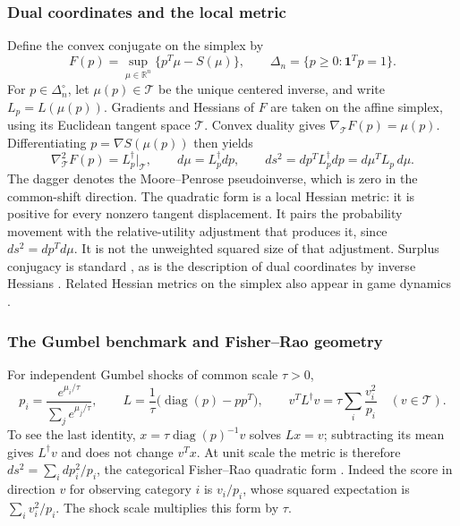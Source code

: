 \documentclass[11pt]{amsart}
\newcommand{\R}{\mathbb R}
\newcommand{\one}{\mathbf 1}
\newcommand{\diag}{\operatorname{diag}}
\theoremstyle{definition}
\begin{document}
\subsubsection{Dual coordinates and the local metric}
Define the convex conjugate on the simplex by
\begin{equation}\label{eq:conjugate}
 F(p)=\sup_{\mu\in\R^n}\{p^T\mu-S(\mu)\},\qquad
 \Delta_n=\{p\geq0:\one^Tp=1\}.
\end{equation}
For $p\in\Delta_n^\circ$, let $\mu(p)\in\mathcal T$ be the unique centered inverse,
and write $L_p=L(\mu(p))$. Gradients and Hessians of $F$ are taken on the
affine simplex, using its Euclidean tangent space $\mathcal T$. Convex duality gives
$\nabla_{\mathcal T}F(p)=\mu(p)$. Differentiating $p=\nabla S(\mu(p))$ then yields
\begin{equation}\label{eq:dual_metric}
 \nabla_{\mathcal T}^2F(p)=L_p^\dagger\big|_{\mathcal T},\qquad
 d\mu=L_p^\dagger dp,\qquad
 ds^2=dp^TL_p^\dagger dp=d\mu^TL_p\,d\mu.
\end{equation}
The dagger denotes the Moore--Penrose pseudoinverse, which is zero in the
common-shift direction. The quadratic form is a local Hessian metric: it is
positive for every nonzero tangent displacement. It pairs the probability
movement with the relative-utility adjustment that produces it, since
$ds^2=dp^Td\mu$. It is not the unweighted squared size of that adjustment.
Surplus conjugacy is standard \cite{fosgerau2016,muller2019}, as is the
description of dual coordinates by inverse Hessians \cite{nielsen2020}.
Related Hessian metrics on the simplex also appear in game dynamics
\cite{mertikopoulos2018}.

\subsubsection{The Gumbel benchmark and Fisher--Rao geometry}
For independent Gumbel shocks of common scale $\tau>0$,
\begin{equation}\label{eq:gumbel_metric}
 p_i=\frac{e^{\mu_i/\tau}}{\sum_j e^{\mu_j/\tau}},\qquad
 L=\frac1\tau\bigl(\diag(p)-pp^T\bigr),\qquad
 v^TL^\dagger v=\tau\sum_i\frac{v_i^2}{p_i}\quad(v\in\mathcal T).
\end{equation}
To see the last identity, $x=\tau\diag(p)^{-1}v$ solves $Lx=v$;
subtracting its mean gives $L^\dagger v$ and does not change $v^Tx$.
At unit scale the metric is therefore
$ds^2=\sum_i dp_i^2/p_i$, the categorical Fisher--Rao quadratic form
\cite{nielsen2020}. Indeed the score in direction $v$ for observing category
$i$ is $v_i/p_i$, whose squared expectation is $\sum_i v_i^2/p_i$.
The shock scale multiplies this form by $\tau$.
\end{document}
